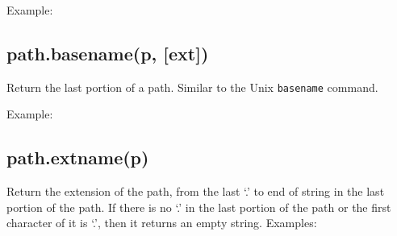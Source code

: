 Example:

\begin{Shaded}
\begin{Highlighting}[]
\NormalTok{(}\NormalTok{)}
\end{Highlighting}
\end{Shaded}

\subsection{path.basename(p, {[}ext{]})}\label{path.basenamep-ext}

Return the last portion of a path. Similar to the Unix \texttt{basename}
command.

Example:

\begin{Shaded}
\begin{Highlighting}[]
\NormalTok{(}\NormalTok{)}

\NormalTok{(}\NormalTok{, }\NormalTok{)}
\end{Highlighting}
\end{Shaded}

\subsection{path.extname(p)}\label{path.extnamep}

Return the extension of the path, from the last `.' to end of string in
the last portion of the path. If there is no `.' in the last portion of
the path or the first character of it is `.', then it returns an empty
string. Examples:

\begin{Shaded}
\begin{Highlighting}[]
\NormalTok{(}\NormalTok{)}

\NormalTok{(}\NormalTok{)}

\NormalTok{(}\NormalTok{)}
\end{Highlighting}
\end{Shaded}

